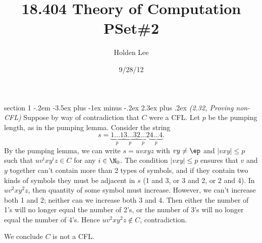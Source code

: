 
\makeatother



%
%
\makeatletter
\newenvironment{problem}{\@startsection
       {section}
       {1}
       {-.2em}
       {-3.5ex plus -1ex minus -.2ex}
       {2.3ex plus .2ex}
       {\pagebreak[3]%
       \large\bf\noindent{Problem }
       }
       }
       {%
       }
\makeatother

\renewcommand{\div}{\operatorname{div}}
%
%
\usepackage{fancyhdr}
\pagestyle{fancy}
\chead{} 
\rhead{\thepage} 
\cfoot{} 
\renewcommand{\headrulewidth}{.3pt} 
\renewcommand{\footrulewidth}{.3pt}
\setlength\voffset{-0.25in}
\setlength\textheight{648pt}



%
%    

\title{18.404 Theory of Computation PSet\#2}%
\author{Holden Lee}
\date{9/28/12}%
\maketitle
\begin{problem}{\it (2.32, Proving non-CFL)}
Suppose by way of contradiction that $C$ were a CFL. Let $p$ be the pumping length, as in the pumping lemma. Consider the string
\[
s=\underbrace{1\ldots 1}_p\underbrace{3\ldots 3}_p
\underbrace{2\ldots 2}_p\underbrace{4\ldots 4}_p.
\]
By the pumping lemma, we can write $s=uvxyz$ with $vy\ne \ep$ and $|vxy|\le p$ such that $uv^ixy^iz\in C$ for any $i\in \N_0$. The condition $|vxy|\le p$ ensures that $v$ and $y$ together can't contain more than 2 types of symbols, and if they contain two kinds of symbols they must be adjacent in $s$ (1 and 3, or 3 and 2, or 2 and 4). In $uv^2xy^2z$, then quantity of some symbol must increase. However, we can't increase both 1 and 2; neither can we increase both 3 and 4. Then either the number of 1's will no longer equal the number of 2's, or the number of 3's will no longer equal the number of 4's. Hence $uv^2xy^2z\nin C$, contradiction.

We conclude $C$ is not a CFL. 

\end{problem}

